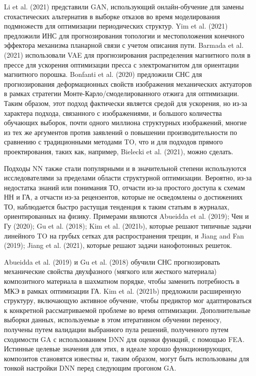 Li et al. (2021) представили GAN, использующий онлайн-обучение для замены стохастических альтернатив в выборке отказов во время моделирования подмножеств для оптимизации периодических структур. Yim et al. (2021) предложили ИНС для прогнозирования топологии и местоположения конечного эффектора механизма планарной связи с учетом описания пути. Barmada et al. (2021) использовали VAE для прогнозирования распределения магнитного поля в прессе для ускорения оптимизации пресса с электромагнитом для ориентации магнитного порошка. Bonfanti et al. (2020) предложили СНС для прогнозирования деформационных свойств изображения механических актуаторов в рамках стратегии Монте-Карло/смоделированного отжига для оптимизации. Таким образом, этот подход фактически является средой для ускорения, но из-за характера подхода, связанного с изображениями, и большого количества обучающих выборок, почти одного миллиона структурных изображений, многие из тех же аргументов против заявлений о повышении производительности по сравнению с традиционными методами TO, что и для подходов прямого проектирования, таких как, например, Bielecki et al. (2021), можно сделать.

Подходы NN также стали популярными и в значительной степени используются исследователями за пределами области структурной оптимизации. Вероятно, из-за недостатка знаний или понимания ТО, отчасти из-за простого доступа к схемам НН и ГА, а отчасти из-за рецензентов, которые не осведомлены о достижениях ТО, наблюдается быстро растущая тенденция к таким статьям в журналах, ориентированных на физику. Примерами являются Abueidda et al. (2019); Чен и Гу (2020); Gu et al. (2018); Kim et al. (2021b), которые решают типичные задачи линейного TO на грубых сетках для распространения трещин, и Jiang and Fan (2019); Jiang et al. (2021), которые решают задачи нанофотонных решеток.

Abueidda et al. (2019) и Gu et al. (2018) обучили СНС прогнозировать механические свойства двухфазного (мягкого или жесткого материала) композитного материала в шахматном порядке, чтобы заменить потребность в МКЭ в рамках оптимизации ГА. Kim et al. (2021b) предложили расширенную структуру, включающую активное обучение, чтобы предиктор мог адаптироваться к конкретной рассматриваемой проблеме во время оптимизации. Дополнительные выборки данных, используемые в этом итеративном обучении переносу, получены путем валидации выбранного пула решений, полученного путем сходимости GA с использованием DNN для оценки функций, с помощью FEA. Истинные целевые значения для этих, в идеале хорошо функционирующих, композитов становятся известны и, таким образом, могут быть использованы для тонкой настройки DNN перед следующим прогоном GA.

